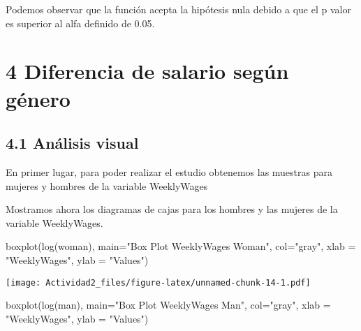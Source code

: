 \documentclass[
  a4paper]{article}
\newenvironment{Shaded}{\begin{snugshade}}{\end{snugshade}}
\newcommand{\AttributeTok}[1]{\textcolor[rgb]{0.77,0.63,0.00}{#1}}
\newcommand{\FunctionTok}[1]{\textcolor[rgb]{0.00,0.00,0.00}{#1}}
\newcommand{\NormalTok}[1]{#1}
\newcommand{\OtherTok}[1]{\textcolor[rgb]{0.56,0.35,0.01}{#1}}
\newcommand{\SpecialCharTok}[1]{\textcolor[rgb]{0.00,0.00,0.00}{#1}}
\newcommand{\StringTok}[1]{\textcolor[rgb]{0.31,0.60,0.02}{#1}}
\begin{document}
Podemos observar que la función acepta la hipótesis nula debido a que el
p valor es superior al alfa definido de 0.05.

\hypertarget{diferencia-de-salario-seguxfan-guxe9nero}{%
\section{4 Diferencia de salario según
género}\label{diferencia-de-salario-seguxfan-guxe9nero}}

\hypertarget{anuxe1lisis-visual-1}{%
\subsection{4.1 Análisis visual}\label{anuxe1lisis-visual-1}}

En primer lugar, para poder realizar el estudio obtenemos las muestras
para mujeres y hombres de la variable WeeklyWages

\begin{Shaded}
\end{Shaded}

Mostramos ahora los diagramas de cajas para los hombres y las mujeres de
la variable WeeklyWages.

\begin{Shaded}
\begin{Highlighting}[]
\FunctionTok{boxplot}\NormalTok{(}\FunctionTok{log}\NormalTok{(woman), }\AttributeTok{main=}\StringTok{"Box Plot WeeklyWages Woman"}\NormalTok{, }\AttributeTok{col=}\StringTok{"gray"}\NormalTok{, }\AttributeTok{xlab =} \StringTok{"WeeklyWages"}\NormalTok{, }\AttributeTok{ylab =} \StringTok{"Values"}\NormalTok{)}
\end{Highlighting}
\end{Shaded}

\texttt{[image: Actividad2\_files/figure-latex/unnamed-chunk-14-1.pdf]}

\begin{Shaded}
\begin{Highlighting}[]
\FunctionTok{boxplot}\NormalTok{(}\FunctionTok{log}\NormalTok{(man), }\AttributeTok{main=}\StringTok{"Box Plot WeeklyWages Man"}\NormalTok{, }\AttributeTok{col=}\StringTok{"gray"}\NormalTok{, }\AttributeTok{xlab =} \StringTok{"WeeklyWages"}\NormalTok{, }\AttributeTok{ylab =} \StringTok{"Values"}\NormalTok{)}
\end{Highlighting}
\end{Shaded}
\end{document}
